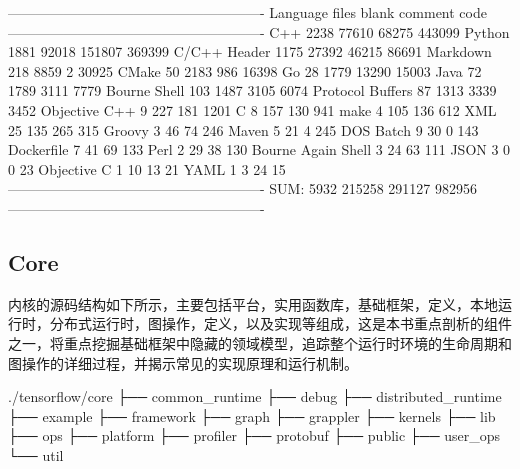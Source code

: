\begin{content}
\begin{leftbar}
\begin{python}[caption={TensorFlow代码统计}]
-------------------------------------------------------
Language             files    blank    comment    code
-------------------------------------------------------
C++                   2238    77610     68275    443099
Python                1881    92018    151807    369399
C/C++ Header          1175    27392     46215     86691
Markdown               218     8859         2     30925
CMake                   50     2183       986     16398
Go                      28     1779     13290     15003
Java                    72     1789      3111      7779
Bourne Shell           103     1487      3105      6074
Protocol Buffers        87     1313      3339      3452
Objective C++            9      227       181      1201
C                        8      157       130       941
make                     4      105       136       612
XML                     25      135       265       315
Groovy                   3       46        74       246
Maven                    5       21         4       245
DOS Batch                9       30         0       143
Dockerfile               7       41        69       133
Perl                     2       29        38       130
Bourne Again Shell       3       24        63       111
JSON                     3        0         0        23
Objective C              1       10        13        21
YAML                     1        3        24        15
-------------------------------------------------------
SUM:                  5932   215258    291127    982956
-------------------------------------------------------
\end{python}
\end{leftbar}

\subsection{Core}

内核的源码结构如下所示，主要包括平台，实用函数库，基础框架，定义，本地运行时，分布式运行时，图操作，定义，以及实现等组成，这是本书重点剖析的组件之一，将重点挖掘基础框架中隐藏的领域模型，追踪整个运行时环境的生命周期和图操作的详细过程，并揭示常见的实现原理和运行机制。

\begin{leftbar}
\begin{c++}[caption={Core源码结构}]
./tensorflow/core
├── common_runtime
├── debug
├── distributed_runtime
├── example
├── framework
├── graph
├── grappler
├── kernels
├── lib
├── ops
├── platform
├── profiler
├── protobuf
├── public
├── user_ops
└── util
\end{c++}
\end{leftbar}


\end{content}
